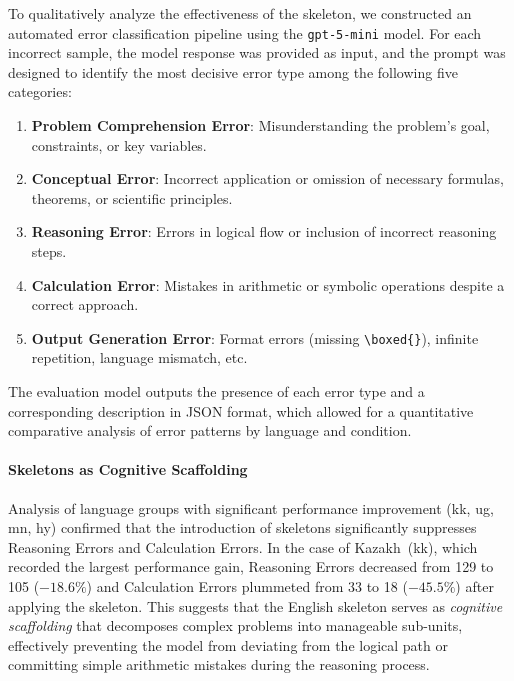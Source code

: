 To qualitatively analyze the effectiveness of the skeleton, we constructed an automated error classification pipeline using the \texttt{gpt-5-mini} model. For each incorrect sample, the model response was provided as input, and the prompt was designed to identify the most decisive error type among the following five categories:

\begin{enumerate}
    \item \textbf{Problem Comprehension Error}: Misunderstanding the problem's goal, constraints, or key variables.
    \item \textbf{Conceptual Error}: Incorrect application or omission of necessary formulas, theorems, or scientific principles.
    \item \textbf{Reasoning Error}: Errors in logical flow or inclusion of incorrect reasoning steps.
    \item \textbf{Calculation Error}: Mistakes in arithmetic or symbolic operations despite a correct approach.
    \item \textbf{Output Generation Error}: Format errors (missing \verb|\boxed{}|), infinite repetition, language mismatch, etc.
\end{enumerate}

The evaluation model outputs the presence of each error type and a corresponding description in JSON format, which allowed for a quantitative comparative analysis of error patterns by language and condition.


\paragraph{Skeletons as Cognitive Scaffolding}
Analysis of language groups with significant performance improvement (kk, ug, mn, hy) confirmed that the introduction of skeletons significantly suppresses Reasoning Errors and Calculation Errors.
In the case of Kazakh~(kk), which recorded the largest performance gain, Reasoning Errors decreased from 129 to 105 ($-18.6\%$) and Calculation Errors plummeted from 33 to 18 ($-45.5\%$) after applying the skeleton.
This suggests that the English skeleton serves as \textit{cognitive scaffolding} that decomposes complex problems into manageable sub-units, effectively preventing the model from deviating from the logical path or committing simple arithmetic mistakes during the reasoning process.

